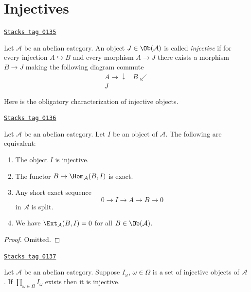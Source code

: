 \section{Injectives}
\label{homology-section-injectives}
\begin{definition}[Injective]
\label{homology-definition-injective}
\href{https://stacks.math.columbia.edu/tag/0135}{\texttt{Stacks tag 0135}}

Let $\mathcal{A}$ be an abelian category.
An object $J \in \Ob(\mathcal{A})$ is
called {\it injective} if for every injection
$A \hookrightarrow B$ and every morphism
$A \to J$ there exists a morphism $B \to J$ making
the following diagram commute
$$
\begin{array}{cc}A \longrightarrow\downarrow & B \swarrow \\ J & \end{array}
$$
\end{definition}

Here is the obligatory characterization of injective objects.

\begin{lemma}
\label{homology-lemma-characterize-injectives}
\href{https://stacks.math.columbia.edu/tag/0136}{\texttt{Stacks tag 0136}}

Let $\mathcal{A}$ be an abelian category.
Let $I$ be an object of $\mathcal{A}$.
The following are equivalent:
\begin{enumerate}
\item The object $I$ is injective.
\item The functor $B \mapsto \Hom_\mathcal{A}(B, I)$
is exact.
\item Any short exact sequence
$$
0 \to I \to A \to B \to 0
$$
in $\mathcal{A}$ is split.
\item We have $\Ext_\mathcal{A}(B, I) = 0$ for
all $B \in \Ob(\mathcal{A})$.
\end{enumerate}
\end{lemma}

\begin{proof}
Omitted.
\end{proof}

\begin{lemma}
\label{homology-lemma-product-injectives}
\href{https://stacks.math.columbia.edu/tag/0137}{\texttt{Stacks tag 0137}}

Let $\mathcal{A}$ be an abelian category.
Suppose $I_\omega$, $\omega \in \Omega$ is a set of injective
objects of $\mathcal{A}$. If $\prod_{\omega \in \Omega} I_\omega$
exists then it is injective.
\end{lemma}

